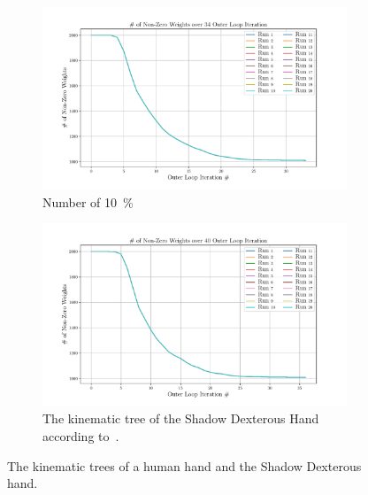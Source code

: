 \begin{figure}[!h]
	\centering
	\begin{subfigure}[b]{0.48\textwidth}
		\centering
		\includegraphics[width=\textwidth]{chapters/2-pose-estimation/fig/GNC-TLS-w-run-10-conv.pdf}
		\caption{Number of \SI{10}{\percent}}
		\label{app:GNC-TLS-w-run-10-conv}
	\end{subfigure}
	\hfill
	\begin{subfigure}[b]{0.48\textwidth}
		\centering
		\includegraphics[width=\textwidth]{chapters/2-pose-estimation/fig/GNC-TLS-w-run-20-conv.pdf}
		\caption{The kinematic tree of the Shadow Dexterous Hand according to~\cite{robot-hand-kinematics}. \newline}
		\label{app:GNC-TLS-w-run-20-conv}
	\end{subfigure}
	\caption{The kinematic trees of a human hand and the Shadow Dexterous hand.}
	\label{app:GNC-TLS-w-run-10-20-conv}
\end{figure}
